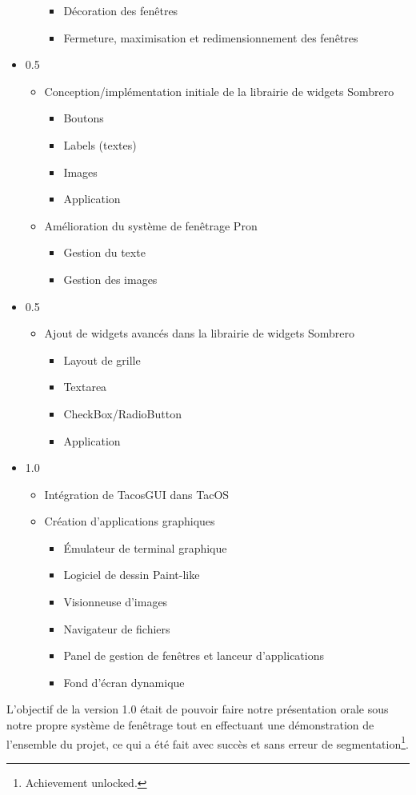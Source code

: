 \begin{itemize}
\begin{itemize}
        \begin{itemize}
          \item Décoration des fenêtres
          \item Fermeture, maximisation et redimensionnement des fenêtres
      \end{itemize}
  \end{itemize}
  \item 0.5
    \begin{itemize}
      \item Conception/implémentation initiale de la librairie de widgets Sombrero
        \begin{itemize}
          \item Boutons
          \item Labels (textes)
          \item Images
          \item Application
      \end{itemize}
      \item Amélioration du système de fenêtrage Pron
        \begin{itemize}
          \item Gestion du texte
          \item Gestion des images
      \end{itemize}
  \end{itemize}
  \item 0.5
    \begin{itemize}
      \item Ajout de widgets avancés dans la librairie de widgets Sombrero
        \begin{itemize}
          \item Layout de grille
          \item Textarea
          \item CheckBox/RadioButton
          \item Application
        \end{itemize}
    \end{itemize}
  \item 1.0
    \begin{itemize}
      \item Intégration de TacosGUI dans TacOS
      \item Création d'applications graphiques
        \begin{itemize}
          \item Émulateur de terminal graphique
          \item Logiciel de dessin Paint-like
          \item Visionneuse d'images
          \item Navigateur de fichiers
          \item Panel de gestion de fenêtres et lanceur d'applications
          \item Fond d'écran dynamique
        \end{itemize}
    \end{itemize}
\end{itemize}

L'objectif de la version 1.0 était de pouvoir faire notre présentation orale sous notre propre système de fenêtrage tout en effectuant une démonstration de l'ensemble du projet, ce qui a été fait avec succès et sans erreur de segmentation\footnote{Achievement unlocked.}.
